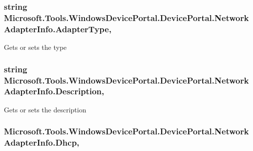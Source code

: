 \subsubsection[{\texorpdfstring{Adapter\+Type}{AdapterType}}]{\setlength{\rightskip}{0pt plus 5cm}string Microsoft.\+Tools.\+Windows\+Device\+Portal.\+Device\+Portal.\+Network\+Adapter\+Info.\+Adapter\+Type\hspace{0.3cm}{\ttfamily [get]}, {\ttfamily [set]}}\hypertarget{class_microsoft_1_1_tools_1_1_windows_device_portal_1_1_device_portal_1_1_network_adapter_info_accde41e0b52f24ab0392fec5f3a9222d}{}\label{class_microsoft_1_1_tools_1_1_windows_device_portal_1_1_device_portal_1_1_network_adapter_info_accde41e0b52f24ab0392fec5f3a9222d}


Gets or sets the type 

\subsubsection[{\texorpdfstring{Description}{Description}}]{\setlength{\rightskip}{0pt plus 5cm}string Microsoft.\+Tools.\+Windows\+Device\+Portal.\+Device\+Portal.\+Network\+Adapter\+Info.\+Description\hspace{0.3cm}{\ttfamily [get]}, {\ttfamily [set]}}\hypertarget{class_microsoft_1_1_tools_1_1_windows_device_portal_1_1_device_portal_1_1_network_adapter_info_ab2697adebb9cfb1369058d5fa6b0d63c}{}\label{class_microsoft_1_1_tools_1_1_windows_device_portal_1_1_device_portal_1_1_network_adapter_info_ab2697adebb9cfb1369058d5fa6b0d63c}


Gets or sets the description 

\subsubsection[{\texorpdfstring{Dhcp}{Dhcp}}]{ Microsoft.\+Tools.\+Windows\+Device\+Portal.\+Device\+Portal.\+Network\+Adapter\+Info.\+Dhcp\hspace{0.3cm}{\ttfamily [get]}, {\ttfamily [set]}}\hypertarget{class_microsoft_1_1_tools_1_1_windows_device_portal_1_1_device_portal_1_1_network_adapter_info_a2881a656987d66a6f51724a086353b22}{}\label{class_microsoft_1_1_tools_1_1_windows_device_portal_1_1_device_portal_1_1_network_adapter_info_a2881a656987d66a6f51724a086353b22}


